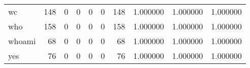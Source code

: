 \begin{tabular}{lrrrrrrrrr}
wc        &                                   148 &                                                  0 &                                                  0 &                                                  0 &                                                  0 &                                                148 &                                           1.000000 &                               1.000000 &                             1.000000 \\
who       &                                   158 &                                                  0 &                                                  0 &                                                  0 &                                                  0 &                                                158 &                                           1.000000 &                               1.000000 &                             1.000000 \\
whoami    &                                    68 &                                                  0 &                                                  0 &                                                  0 &                                                  0 &                                                 68 &                                           1.000000 &                               1.000000 &                             1.000000 \\
yes       &                                    76 &                                                  0 &                                                  0 &                                                  0 &                                                  0 &                                                 76 &                                           1.000000 &                               1.000000 &                             1.000000 \\
\bottomrule
\end{tabular}
